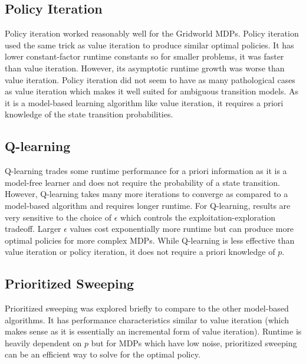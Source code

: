 \documentclass[11pt]{article}
\begin{document}
\subsection{Policy Iteration}
Policy iteration worked reasonably well for the Gridworld MDPs. Policy iteration used the same trick as value iteration to produce similar optimal policies. It has lower constant-factor runtime constants so for smaller problems, it was faster than value iteration. However, its asymptotic runtime growth was worse than value iteration. Policy iteration did not seem to have as many pathological cases as value iteration which makes it well suited for ambiguous transition models. As it is a model-based learning algorithm like value iteration, it requires a priori knowledge of the state transition probabilities.

\subsection{Q-learning}
Q-learning trades some runtime performance for a priori information as it is a model-free learner and does not require the probability of a state transition. However, Q-learning takes many more iterations to converge as compared to a model-based algorithm and requires longer runtime. For Q-learning, results are very sensitive to the choice of $\epsilon$ which controls the exploitation-exploration tradeoff. Larger $\epsilon$ values cost exponentially more runtime but can produce more optimal policies for more complex MDPs. While Q-learning is less effective than value iteration or policy iteration, it does not require a priori knowledge of $p$.

\subsection{Prioritized Sweeping}
Prioritized sweeping was explored briefly to compare to the other model-based algorithms. It has performance characteristics similar to value iteration (which makes sense as it is essentially an incremental form of value iteration). Runtime is heavily dependent on $p$ but for MDPs which have low noise, prioritized sweeping can be an efficient way to solve for the optimal policy.
\end{document}
